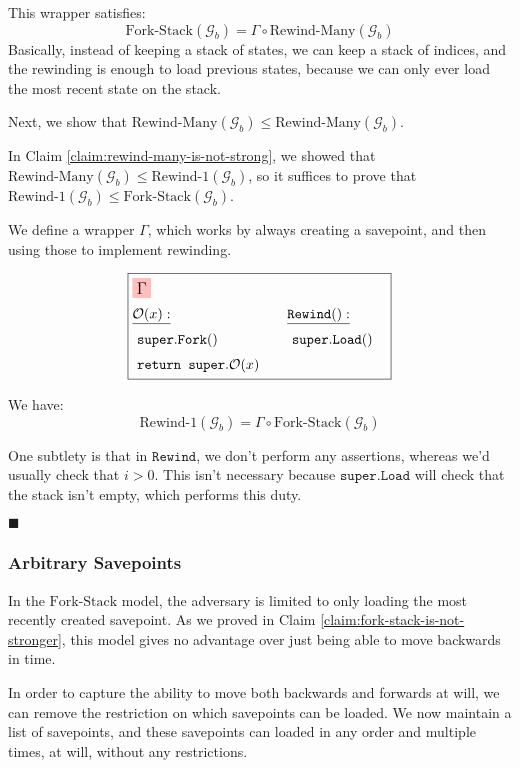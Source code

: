 This wrapper satisfies:
$$
\text{Fork-Stack}(\mathcal{G}_b) = \Gamma \circ \text{Rewind-Many}(\mathcal{G}_b)
$$
Basically, instead of keeping a stack of states, we can keep a stack of indices,
and the rewinding is enough to load previous states, because we can only ever load
the most recent state on the stack.

Next, we show that $\text{Rewind-Many}(\mathcal{G}_b) \leq \text{Rewind-Many}(\mathcal{G}_b)$.

In Claim \ref{claim:rewind-many-is-not-strong}, we showed that
$\text{Rewind-Many}(\mathcal{G}_b) \leq \text{Rewind-1}(\mathcal{G}_b)$, so
it suffices to prove that $\text{Rewind-1}(\mathcal{G}_b) \leq \text{Fork-Stack}(\mathcal{G}_b)$.

We define a wrapper $\Gamma$, which works by always creating a savepoint,
and then using those to implement rewinding.

$$
\boxed{
\begin{aligned}
&\colorbox{pink}{\large $\Gamma$}\cr
&\begin{aligned}
    &\underline{\mathcal{O}(x):}\cr
    &\ \texttt{super}.\texttt{Fork}()\cr
    &\ \texttt{return } \texttt{super}.\mathcal{O}(x)\cr
\end{aligned}
&\begin{aligned}
    &\underline{\texttt{Rewind}():}\cr
    &\ \texttt{super}.\texttt{Load}()\cr
    &\cr
\end{aligned}\cr
\end{aligned}
}
$$

We have:
$$
\text{Rewind-1}(\mathcal{G}_b) = \Gamma \circ \text{Fork-Stack}(\mathcal{G}_b)
$$

One subtlety is that in $\texttt{Rewind}$, we don't perform any assertions,
whereas we'd usually check that $i > 0$.
This isn't necessary because $\texttt{super}.\texttt{Load}$ will check that the stack
isn't empty, which performs this duty.

$\blacksquare$

\subsubsection{Arbitrary Savepoints}

In the $\text{Fork-Stack}$ model, the adversary is limited to only
loading the most recently created savepoint.
As we proved in Claim \ref{claim:fork-stack-is-not-stronger}, this model
gives no advantage over just being able to move backwards in time.

In order to capture the ability to move both backwards and forwards
at will, we can remove the restriction on which savepoints can be loaded.
We now maintain a list of savepoints, and these savepoints can loaded
in any order and multiple times, at will, without any restrictions.

